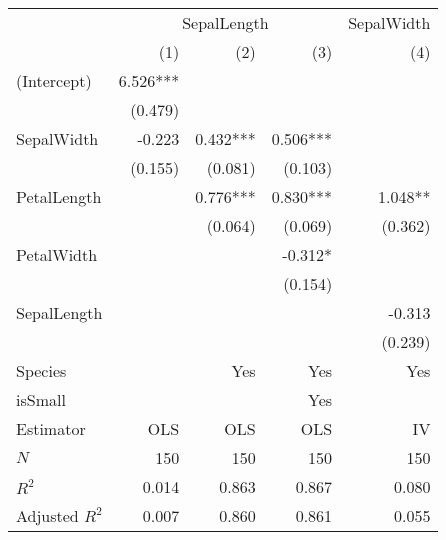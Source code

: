 \begin{tabular}{lrrrr}
\toprule
                          & \multicolumn{3}{c}{SepalLength} & \multicolumn{1}{c}{SepalWidth} \\ 
\cmidrule(lr){2-4} \cmidrule(lr){5-5} 
                          &      (1) &      (2) &       (3) &                            (4) \\ 
\midrule
(Intercept)               & 6.526*** &          &           &                                \\ 
                          &  (0.479) &          &           &                                \\ 
SepalWidth                &   -0.223 & 0.432*** &  0.506*** &                                \\ 
                          &  (0.155) &  (0.081) &   (0.103) &                                \\ 
PetalLength               &          & 0.776*** &  0.830*** &                        1.048** \\ 
                          &          &  (0.064) &   (0.069) &                        (0.362) \\ 
PetalWidth                &          &          &   -0.312* &                                \\ 
                          &          &          &   (0.154) &                                \\ 
SepalLength               &          &          &           &                         -0.313 \\ 
                          &          &          &           &                        (0.239) \\ 
\midrule
Species                   &          &      Yes &       Yes &                            Yes \\ 
isSmall                   &          &          &       Yes &                                \\ 
\midrule
Estimator                 &      OLS &      OLS &       OLS &                             IV \\ 
\midrule
$N$                       &      150 &      150 &       150 &                            150 \\ 
$R^2$                     &    0.014 &    0.863 &     0.867 &                          0.080 \\ 
Adjusted $R^2$            &    0.007 &    0.860 &     0.861 &                          0.055 \\ 

\end{tabular}

